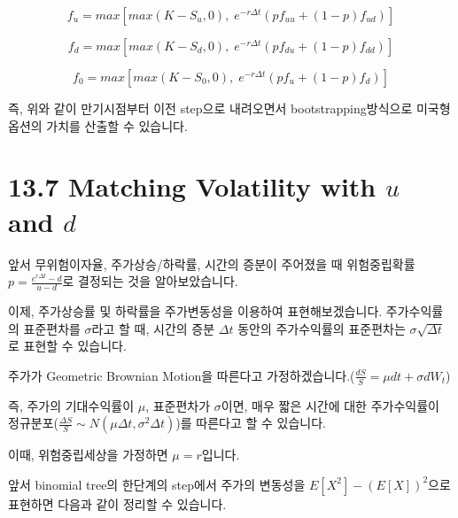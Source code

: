 \documentclass[
  letterpaper,
  DIV=11,
  numbers=noendperiod]{scrreprt}
\begin{document}
\[f_u=max[max(K-S_u,0),\;e^{-r\Delta t}(pf_{uu}+(1-p)f_{ud})]\]

\[f_d=max[max(K-S_d,0),\;e^{-r\Delta t}(pf_{du}+(1-p)f_{dd})]\]

\[f_0=max[max(K-S_0,0),\;e^{-r\Delta t}(pf_u+(1-p)f_d)]\]

즉, 위와 같이 만기시점부터 이전 step으로 내려오면서
bootstrapping방식으로 미국형 옵션의 가치를 산출할 수 있습니다.

\section*{\texorpdfstring{13.7 Matching Volatility with \(u\) and
\(d\)}{13.7 Matching Volatility with u and d}}\label{matching-volatility-with-u-and-d}


앞서 무위험이자율, 주가상승/하락률, 시간의 증분이 주어졌을 때
위험중립확률 \(p=\frac{e^{r\Delta t}-d}{u-d}\)로 결정되는 것을
알아보았습니다.

이제, 주가상승률 및 하락률을 주가변동성을 이용하여 표현해보겠습니다.
주가수익률의 표준편차를 \(\sigma\)라고 할 때, 시간의 증분 \(\Delta t\)
동안의 주가수익률의 표준편차는 \(\sigma\sqrt{\Delta t}\)로 표현할 수
있습니다.

\begin{tcolorbox}[enhanced jigsaw, toprule=.15mm, breakable, left=2mm, leftrule=.75mm, opacitybacktitle=0.6, coltitle=black, rightrule=.15mm, colback=white, titlerule=0mm, bottomtitle=1mm, colframe=quarto-callout-important-color-frame, title=\textcolor{quarto-callout-important-color}{\faExclamation}\hspace{0.5em}{Chapter 15 : 주요 내용}, toptitle=1mm, arc=.35mm, colbacktitle=quarto-callout-important-color!10!white, opacityback=0, bottomrule=.15mm]

주가가 Geometric Brownian Motion을 따른다고
가정하겠습니다.(\(\frac{dS}{S}=\mu dt+\sigma dW_t\))

즉, 주가의 기대수익률이 \(\mu\), 표준편차가 \(\sigma\)이면, 매우 짧은
시간에 대한 주가수익률이
정규분포(\(\frac{\Delta S}{S}\sim N(\mu\Delta t,\sigma^2\Delta t)\))를
따른다고 할 수 있습니다.

이때, 위험중립세상을 가정하면 \(\mu=r\)입니다.

\end{tcolorbox}

앞서 binomial tree의 한단계의 step에서 주가의 변동성을
\(E[X^2]-(E[X])^2\)으로 표현하면 다음과 같이 정리할 수 있습니다.
\end{document}
